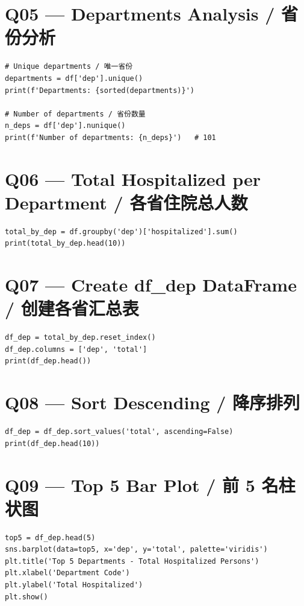 \documentclass[11pt,a4paper]{report}
\begin{document}
\section*{Q05 — Departments Analysis / 省份分析}
\begin{lstlisting}
# Unique departments / 唯一省份
departments = df['dep'].unique()
print(f'Departments: {sorted(departments)}')

# Number of departments / 省份数量
n_deps = df['dep'].nunique()
print(f'Number of departments: {n_deps}')   # 101
\end{lstlisting}

\section*{Q06 — Total Hospitalized per Department / 各省住院总人数}
\begin{lstlisting}
total_by_dep = df.groupby('dep')['hospitalized'].sum()
print(total_by_dep.head(10))
\end{lstlisting}

\section*{Q07 — Create df\_dep DataFrame / 创建各省汇总表}
\begin{lstlisting}
df_dep = total_by_dep.reset_index()
df_dep.columns = ['dep', 'total']
print(df_dep.head())
\end{lstlisting}

\section*{Q08 — Sort Descending / 降序排列}
\begin{lstlisting}
df_dep = df_dep.sort_values('total', ascending=False)
print(df_dep.head(10))
\end{lstlisting}

\section*{Q09 — Top 5 Bar Plot / 前 5 名柱状图}
\begin{lstlisting}
top5 = df_dep.head(5)
sns.barplot(data=top5, x='dep', y='total', palette='viridis')
plt.title('Top 5 Departments - Total Hospitalized Persons')
plt.xlabel('Department Code')
plt.ylabel('Total Hospitalized')
plt.show()
\end{lstlisting}
\end{document}
